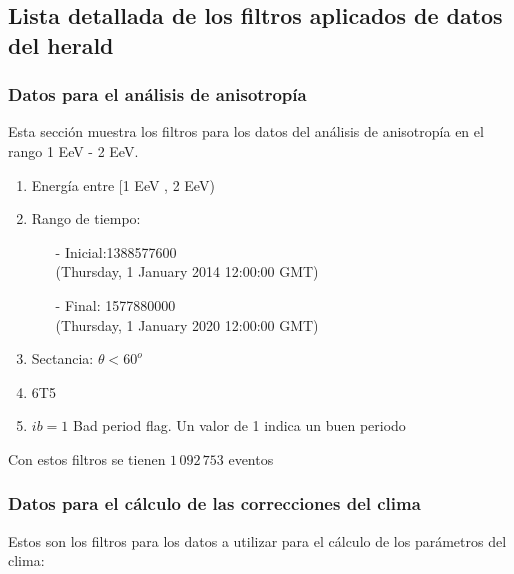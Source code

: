 \subsection{Lista detallada de los filtros aplicados de datos del herald}

\subsubsection{Datos para el análisis de anisotropía}
Esta sección muestra los filtros para los datos del análisis de anisotropía en el rango 1 EeV - 2 EeV.

\begin{enumerate}
	\item Energía entre  [1 EeV , 2 EeV)
	\item Rango de tiempo:
	\begin{itemize}
		\item[-] Inicial:1388577600 \\ (Thursday, 1 January 2014 12:00:00 GMT)
		\item[-] Final: 1577880000  \\ (Thursday, 1 January 2020 12:00:00 GMT)
	\end{itemize}
	\item Sectancia:  $\theta < 60^o$
	\item 6T5
	\item $ib=1$ Bad period flag. Un valor de 1 indica un buen periodo
\end{enumerate}

Con estos filtros se tienen $1\,092\,753$ eventos

\subsubsection{Datos para el cálculo de las correcciones del clima}

Estos son los filtros para los datos a utilizar para el cálculo de los parámetros del clima:

